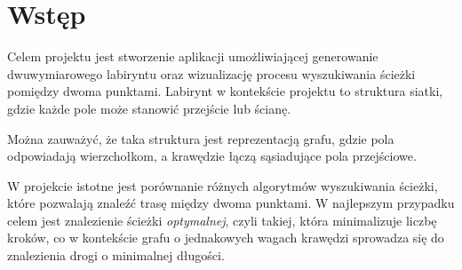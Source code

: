 \section{Wstęp}

Celem projektu jest stworzenie aplikacji umożliwiającej generowanie dwuwymiarowego labiryntu oraz wizualizację procesu wyszukiwania ścieżki pomiędzy dwoma punktami.
Labirynt w kontekście projektu to struktura siatki, gdzie każde pole może stanowić przejście lub ścianę. 



Można zauważyć, że taka struktura jest reprezentacją grafu, gdzie pola odpowiadają wierzchołkom, a krawędzie łączą sąsiadujące pola przejściowe.



W projekcie istotne jest porównanie różnych algorytmów wyszukiwania ścieżki, które pozwalają znaleźć trasę między dwoma punktami. W najlepszym przypadku celem jest znalezienie ścieżki \textit{optymalnej}, czyli takiej, która minimalizuje liczbę kroków, co w kontekście grafu o jednakowych wagach krawędzi sprowadza się do znalezienia drogi o minimalnej długości.

\newpage

